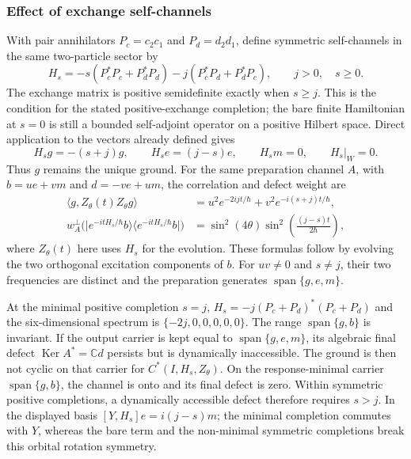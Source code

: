 \documentclass[11pt,reqno]{scrartcl}
\newcommand{\CC}{\mathbb C}
\newcommand{\ket}[1]{\lvert #1\rangle}
\newcommand{\bra}[1]{\langle #1\rvert}
\newcommand{\proj}[1]{\ket{#1}\!\bra{#1}}
\DeclareMathOperator{\Ker}{Ker}
\DeclareMathOperator{\Span}{span}
\newcommand{\defectWeight}{w_{A}^{\perp}}
\theoremstyle{plain}
\theoremstyle{definition}
\theoremstyle{remark}
\begin{document}
\subsubsection*{Effect of exchange self-channels}

With pair annihilators $P_c=c_2c_1$ and $P_d=d_2d_1$, define symmetric
self-channels in the same two-particle sector by
\begin{equation}
 H_s=-s(P_c^*P_c+P_d^*P_d)
       -j(P_c^*P_d+P_d^*P_c),\qquad j>0,\quad s\geq0.
 \label{eq:pair-completed-hamiltonian}
\end{equation}
The exchange matrix is positive semidefinite exactly when $s\geq j$.
This is the condition for the stated positive-exchange completion;
the bare finite Hamiltonian at $s=0$ is still a bounded self-adjoint
operator on a positive Hilbert space.
Direct application to the vectors already defined gives
\begin{equation}
 H_sg=-(s+j)g,\qquad H_se=(j-s)e,\qquad
 H_sm=0,\qquad H_s|_W=0.
 \label{eq:pair-completed-spectrum}
\end{equation}
Thus $g$ remains the unique ground.  For the same preparation channel
$A$, with $b=ue+vm$ and $d=-ve+um$, the correlation and defect weight are
\begin{align}
 \langle g,Z_\theta(t)Z_\theta g\rangle
 &=u^2e^{-2ijt/\hbar}+v^2e^{-i(s+j)t/\hbar},\\
 \defectWeight\bigl(\proj{e^{-itH_s/\hbar}b}\bigr)
 &=\sin^2(4\theta)\sin^2\!\left(\frac{(j-s)t}{2\hbar}\right),
 \label{eq:pair-completed-response}
\end{align}
where $Z_\theta(t)$ here uses $H_s$ for the evolution.  These formulas
follow by evolving the two orthogonal excitation components of $b$.
For $uv\ne0$ and $s\ne j$, their two frequencies are distinct and
the preparation generates $\Span\{g,e,m\}$.

At the minimal positive completion $s=j$,
$H_s=-j(P_c+P_d)^*(P_c+P_d)$ and the six-dimensional spectrum is
$\{-2j,0,0,0,0,0\}$.  The range $\Span\{g,b\}$ is invariant.
If the output carrier is kept equal to $\Span\{g,e,m\}$, its algebraic
final defect $\Ker A^*=\CC d$ persists but is dynamically inaccessible.
The ground is then not cyclic on that carrier for $C^*(I,H_s,Z_\theta)$.
On the response-minimal carrier $\Span\{g,b\}$, the channel is onto
and its final defect is zero.  Within symmetric positive completions,
a dynamically accessible defect therefore requires $s>j$.
In the displayed basis $[Y,H_s]e=i(j-s)m$; the minimal completion
commutes with $Y$, whereas the bare term and the non-minimal symmetric
completions break this orbital rotation symmetry.
\end{document}
